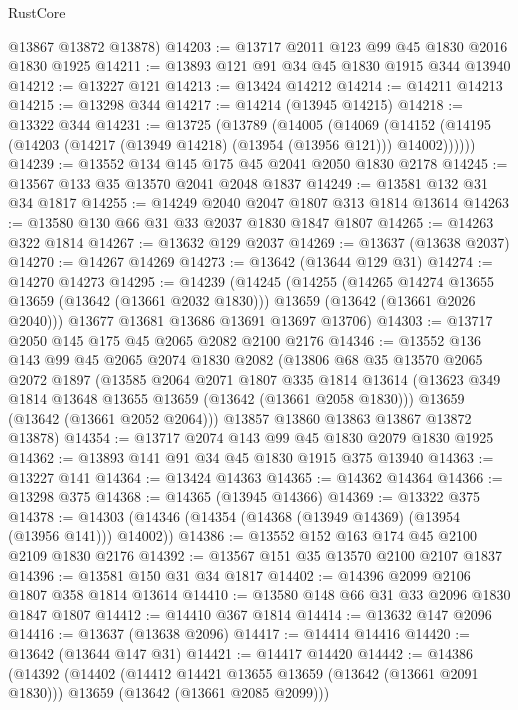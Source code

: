 \begin{lexlean}{RustCore}
\begin{coremodule}
      @13867
      @13872
      @13878)
@14203 := @13717 @2011 @123 @99 @45 @1830 @2016 @1830 @1925
@14211 := @13893 @121 @91 @34 @45 @1830 @1915 @344 @13940
@14212 := @13227 @121
@14213 := @13424 @14212
@14214 := @14211 @14213
@14215 := @13298 @344
@14217 := @14214 (@13945 @14215)
@14218 := @13322 @344
@14231 := @13725
    (@13789
      (@14005
        (@14069 (@14152 (@14195 (@14203 (@14217 (@13949 @14218) (@13954 (@13956 @121))) @14002))))))
@14239 := @13552 @134 @145 @175 @45 @2041 @2050 @1830 @2178
@14245 := @13567 @133 @35 @13570 @2041 @2048 @1837
@14249 := @13581 @132 @31 @34 @1817
@14255 := @14249 @2040 @2047 @1807 @313 @1814 @13614
@14263 := @13580 @130 @66 @31 @33 @2037 @1830 @1847 @1807
@14265 := @14263 @322 @1814
@14267 := @13632 @129 @2037
@14269 := @13637 (@13638 @2037)
@14270 := @14267 @14269
@14273 := @13642 (@13644 @129 @31)
@14274 := @14270 @14273
@14295 := @14239
    (@14245
      (@14255
        (@14265 @14274 @13655 @13659 (@13642 (@13661 @2032 @1830)))
        @13659
        (@13642 (@13661 @2026 @2040)))
      @13677
      @13681
      @13686
      @13691
      @13697
      @13706)
@14303 := @13717 @2050 @145 @175 @45 @2065 @2082 @2100 @2176
@14346 := @13552
    @136
    @143
    @99
    @45
    @2065
    @2074
    @1830
    @2082
    (@13806
      @68
      @35
      @13570
      @2065
      @2072
      @1897
      (@13585
        @2064
        @2071
        @1807
        @335
        @1814
        @13614
        (@13623 @349 @1814 @13648 @13655 @13659 (@13642 (@13661 @2058 @1830)))
        @13659
        (@13642 (@13661 @2052 @2064)))
      @13857
      @13860
      @13863
      @13867
      @13872
      @13878)
@14354 := @13717 @2074 @143 @99 @45 @1830 @2079 @1830 @1925
@14362 := @13893 @141 @91 @34 @45 @1830 @1915 @375 @13940
@14363 := @13227 @141
@14364 := @13424 @14363
@14365 := @14362 @14364
@14366 := @13298 @375
@14368 := @14365 (@13945 @14366)
@14369 := @13322 @375
@14378 := @14303 (@14346 (@14354 (@14368 (@13949 @14369) (@13954 (@13956 @141))) @14002))
@14386 := @13552 @152 @163 @174 @45 @2100 @2109 @1830 @2176
@14392 := @13567 @151 @35 @13570 @2100 @2107 @1837
@14396 := @13581 @150 @31 @34 @1817
@14402 := @14396 @2099 @2106 @1807 @358 @1814 @13614
@14410 := @13580 @148 @66 @31 @33 @2096 @1830 @1847 @1807
@14412 := @14410 @367 @1814
@14414 := @13632 @147 @2096
@14416 := @13637 (@13638 @2096)
@14417 := @14414 @14416
@14420 := @13642 (@13644 @147 @31)
@14421 := @14417 @14420
@14442 := @14386
    (@14392
      (@14402
        (@14412 @14421 @13655 @13659 (@13642 (@13661 @2091 @1830)))
        @13659
        (@13642 (@13661 @2085 @2099)))

\end{coremodule}
\end{lexlean}
